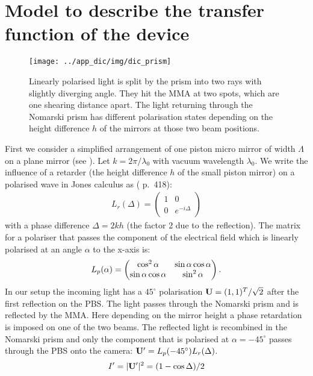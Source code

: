 \section{Model to describe the transfer function of the device}
\begin{figure}[htb]
  \centering
  \texttt{[image: ../app\_dic/img/dic\_prism]}
  \caption{ Linearly polarised light is split by the prism into two
    rays with slightly diverging angle. They hit the MMA at two spots,
    which are one shearing distance apart. The light returning through
    the Nomarski prism has different polarisation states depending on
    the height difference $h$ of the mirrors at those two beam
    positions.}
  \label{fig:prism}
\end{figure}
First we consider a simplified arrangement of one piston micro mirror
of width $\Lambda$ on a plane mirror (see ).  Let
$k=2\pi/\lambda_0$ with vacuum wavelength $\lambda_0$. We write the
influence of a retarder (the height difference $h$ of the small piston
mirror) on a polarised wave in Jones calculus as (\cite{1996Goodman}
p.~418):
\begin{align}
L_r(\Delta)=\begin{pmatrix}1&0\\ 0&e^{-i\Delta}\end{pmatrix}
\end{align}
with a phase difference $\Delta=2kh$ (the factor 2 due to the
reflection).  The matrix for a polariser that passes the component of
the electrical field which is linearly polarised at an angle $\alpha$
to the x-axis is:
\begin{align}
L_p(\alpha)=\begin{pmatrix}\cos^2\alpha&\sin\alpha\cos\alpha\cr
  \sin\alpha\cos\alpha&\sin^2\alpha\end{pmatrix}.
\end{align}
In our setup the incoming light has a $45^\circ$ polarisation $\mathbf{U}=(1,1)^T/\sqrt{2}$ after the first reflection on the PBS. The light
passes through the Nomarski prism and is reflected by the MMA. Here
depending on the mirror height a phase retardation is imposed on one
of the two beams. The reflected light is recombined in the Nomarski
prism and only the component that is polarised at $\alpha=-45^\circ$
passes through the PBS onto the camera: $\mathbf{U}'=L_p(-45^\circ)L_r(\Delta)$.
\begin{align}
  I'=|\mathbf{U}'|^2=(1-\cos\Delta)/2
\end{align}

